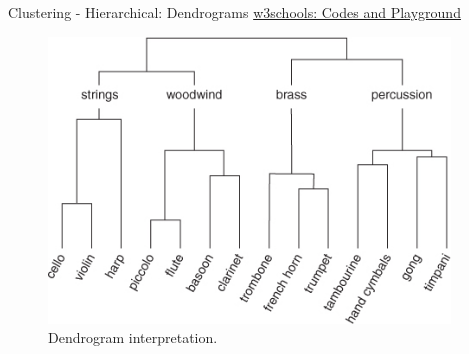 \begin{frame}[allowframebreaks]{Clustering - Hierarchical: Dendrograms}
\href{https://www.w3schools.com/python/python_ml_hierarchial_clustering.asp}{w3schools: Codes and Playground}

\framebreak

\begin{figure}
    \centering
    \includegraphics[width=0.95\textwidth,height=0.85\textheight,keepaspectratio]{images/dul/hierarchical/dendrogram-interpretation.png}
    \caption{Dendrogram interpretation.}
\end{figure}
\end{frame}


